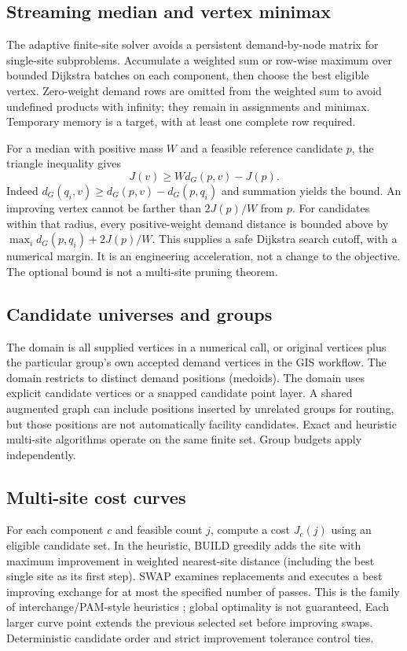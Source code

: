 \documentclass[11pt,a4paper]{article}
\newcommand{\code}[1]{\texttt{\detokenize{#1}}}
\newcommand{\dist}{d_G}
\begin{document}
\subsection{Streaming median and vertex minimax}
The adaptive finite-site solver avoids a persistent demand-by-node matrix for single-site subproblems. Accumulate a weighted sum or row-wise maximum over bounded Dijkstra batches on each component, then choose the best eligible vertex. Zero-weight demand rows are omitted from the weighted sum to avoid undefined products with infinity; they remain in assignments and minimax. Temporary memory is a target, with at least one complete row required.

For a median with positive mass $W$ and a feasible reference candidate $p$, the triangle inequality gives
\[
 J(v)\ge W\dist(p,v)-J(p).
\]
Indeed $\dist(q_i,v)\ge\dist(p,v)-\dist(p,q_i)$ and summation yields the bound. An improving vertex cannot be farther than $2J(p)/W$ from $p$. For candidates within that radius, every positive-weight demand distance is bounded above by $\max_i\dist(p,q_i)+2J(p)/W$. This supplies a safe Dijkstra search cutoff, with a numerical margin. It is an engineering acceleration, not a change to the objective. The optional bound is not a multi-site pruning theorem.
\subsection{Candidate universes and groups}
The \code{vertices} domain is all supplied vertices in a numerical call, or original vertices plus the particular group's own accepted demand vertices in the GIS workflow. The \code{demand} domain restricts to distinct demand positions (medoids). The \code{restricted} domain uses explicit candidate vertices or a snapped candidate point layer. A shared augmented graph can include positions inserted by unrelated groups for routing, but those positions are not automatically facility candidates. Exact and heuristic multi-site algorithms operate on the same finite set. Group budgets apply independently.
\subsection{Multi-site cost curves}
For each component $c$ and feasible count $j$, compute a cost $J_c(j)$ using an eligible candidate set. In the heuristic, BUILD greedily adds the site with maximum improvement in weighted nearest-site distance (including the best single site as its first step). SWAP examines replacements and executes a best improving exchange for at most the specified number of passes. This is the family of interchange/PAM-style heuristics \cite{teitz,kaufman}; global optimality is not guaranteed, Each larger curve point extends the previous selected set before improving swaps. Deterministic candidate order and strict improvement tolerance control ties.
\end{document}
